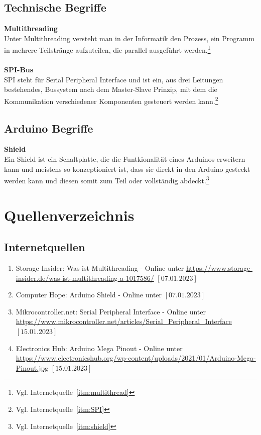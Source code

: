 \documentclass[a4paper, 11pt]{scrartcl}
\begin{document}
\subsection{Technische Begriffe}
\textbf{Multithreading\label{def:multithreading}}
\\
Unter Multithreading versteht man in der Informatik den Prozess, ein Programm in mehrere Teilstränge aufzuteilen, die parallel 
ausgeführt werden.\footnote{Vgl. Internetquelle~\ref{itm:multithread}}
\\
\\
\textbf{SPI-Bus\label{def:SPI}}
\\
SPI steht für Serial Peripheral Interface und ist ein, aus drei Leitungen bestehendes, Bussystem nach dem Master-Slave Prinzip, mit dem die Kommunikation
verschiedener Komponenten gesteuert werden kann.\footnote{Vgl. Internetquelle~\ref{itm:SPI}}
\subsection{Arduino Begriffe}
\textbf{Shield\label{def:shield}}
\\
Ein Shield ist ein Schaltplatte, die die Funtkionalität eines Arduinos erweitern kann und meistens so konzeptioniert ist, dass sie direkt in den Arduino gesteckt werden kann und diesen somit
zum Teil oder vollständig abdeckt.\footnote{Vgl. Internetquelle~\ref{itm:shield}}
\newpage
\section{Quellenverzeichnis}
\subsection{Internetquellen}
\begin{enumerate}
    \item Storage Insider: Was ist Multithreading - Online unter \url{https://www.storage-insider.de/was-ist-multithreading-a-1017586/} $\left[\text{07.01.2023}\right]$ \label{itm:multithread}
    \item Computer Hope: Arduino Shield - Online unter \url{} $\left[\text{07.01.2023}\right]$ \label{itm:shield}
    \item Mikrocontroller.net: Serial Peripheral Interface - Online unter \url{https://www.mikrocontroller.net/articles/Serial_Peripheral_Interface} $\left[\text{15.01.2023}\right]$ \label{itm:SPI}
    \item Electronics Hub: Arduino Mega Pinout - Online unter \url{https://www.electronicshub.org/wp-content/uploads/2021/01/Arduino-Mega-Pinout.jpg} $\left[\text{15.01.2023}\right]$ \label{itm:pinout}
\end{enumerate}
\end{document}
